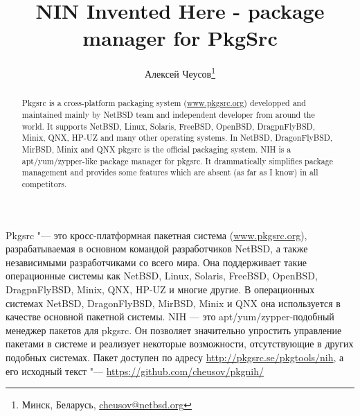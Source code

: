 \documentclass[10pt, a5paper]{article}
\begin{document}
\title{NIN Invented Here - package manager for PkgSrc}
\author{Алексей Чеусов\footnote{Минск, Беларусь, \url{cheusov@netbsd.org}}}
\def\progref!#1!{\texttt{#1}}

\maketitle

\begin{abstract}
Pkgsrc is a cross-platform packaging system (\url{www.pkgsrc.org}) developped
and maintained mainly by NetBSD team and independent developer from
around the world. It supports NetBSD, Linux,
Solaris, FreeBSD, OpenBSD, DragpnFlyBSD, Minix, QNX, HP-UZ and many
other operating systems.  In NetBSD, DragonFlyBSD, MirBSD, Minix and QNX
pkgsrc is the official packaging system. NIH is a apt/yum/zypper-like
package manager for pkgsrc.  It drammatically simplifies package
management and provides some features which are absent (as far as I
know) in all competitors.
\end{abstract}

Pkgsrc "--- это кросс-платформная пакетная система (\url{www.pkgsrc.org}),
разрабатываемая в основном командой разработчиков NetBSD, а также
независимыми разработчиками со всего мира. Она поддерживает такие
операционные системы как NetBSD, Linux, Solaris, FreeBSD, OpenBSD,
DragpnFlyBSD, Minix, QNX, HP-UZ и многие другие. В операционных системах
NetBSD, DragonFlyBSD, MirBSD, Minix и QNX она используется в качестве
основной пакетной системы. NIH --- это apt/yum/zypper-подобный менеджер
пакетов для pkgsrc. Он позволяет значительно упростить управление
пакетами в системе и реализует некоторые возможности, отсутствующие в
других подобных системах.
Пакет доступен по адресу \url{http://pkgsrc.se/pkgtools/nih}, а его 
исходный текст "--- \url{https://github.com/cheusov/pkgnih/}
\end{document}
